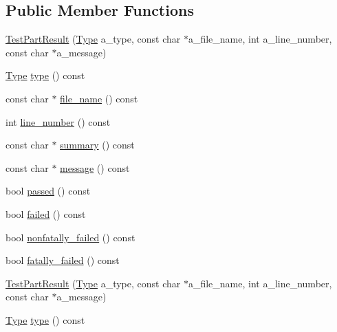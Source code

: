 \subsection*{\-Public \-Member \-Functions}
\begin{DoxyCompactItemize}
\item 
\hyperlink{classtesting_1_1TestPartResult_a563703671116c924ec57ba3e3e68a413}{\-Test\-Part\-Result} (\hyperlink{classtesting_1_1TestPartResult_a1d1cfd8ffb84e947f82999c682b666a7}{\-Type} a\-\_\-type, const char $\ast$a\-\_\-file\-\_\-name, int a\-\_\-line\-\_\-number, const char $\ast$a\-\_\-message)
\item 
\hyperlink{classtesting_1_1TestPartResult_a1d1cfd8ffb84e947f82999c682b666a7}{\-Type} \hyperlink{classtesting_1_1TestPartResult_afbd0fa31db28593e9669c3c56711c0a7}{type} () const 
\item 
const char $\ast$ \hyperlink{classtesting_1_1TestPartResult_a7ad9dbdbba7aafa3aa879707b7702b37}{file\-\_\-name} () const 
\item 
int \hyperlink{classtesting_1_1TestPartResult_aecdfe2926dd4e76f4e583b2c2ec67808}{line\-\_\-number} () const 
\item 
const char $\ast$ \hyperlink{classtesting_1_1TestPartResult_a7ffc48e369e736e843b93b714cf23885}{summary} () const 
\item 
const char $\ast$ \hyperlink{classtesting_1_1TestPartResult_a9477c5ee8f0751018d646f748d5730b0}{message} () const 
\item 
bool \hyperlink{classtesting_1_1TestPartResult_aa3e7216ead0f7e14a72132d181998138}{passed} () const 
\item 
bool \hyperlink{classtesting_1_1TestPartResult_a7b81417e1a230fb8b6f46e5ae68b25d9}{failed} () const 
\item 
bool \hyperlink{classtesting_1_1TestPartResult_ac9d4983902905a04ea6dc9b8de124a7e}{nonfatally\-\_\-failed} () const 
\item 
bool \hyperlink{classtesting_1_1TestPartResult_adda0e486d29cfd3961f0c4c0a6cba187}{fatally\-\_\-failed} () const 
\item 
\hyperlink{classtesting_1_1TestPartResult_a563703671116c924ec57ba3e3e68a413}{\-Test\-Part\-Result} (\hyperlink{classtesting_1_1TestPartResult_a1d1cfd8ffb84e947f82999c682b666a7}{\-Type} a\-\_\-type, const char $\ast$a\-\_\-file\-\_\-name, int a\-\_\-line\-\_\-number, const char $\ast$a\-\_\-message)
\item 
\hyperlink{classtesting_1_1TestPartResult_a1d1cfd8ffb84e947f82999c682b666a7}{\-Type} \hyperlink{classtesting_1_1TestPartResult_afbd0fa31db28593e9669c3c56711c0a7}{type} () const 

\end{DoxyCompactItemize}
